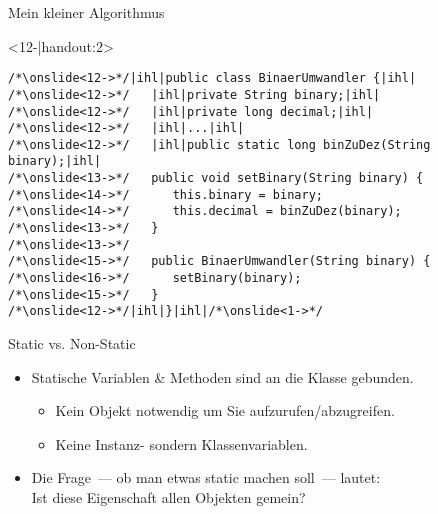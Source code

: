 \begin{frame}[fragile,c]{Mein kleiner Algorithmus}
\begin{onlyenv}<12-|handout:2>
\begin{verbatim}
/*\onslide<12->*/|ihl|public class BinaerUmwandler {|ihl|
/*\onslide<12->*/   |ihl|private String binary;|ihl|
/*\onslide<12->*/   |ihl|private long decimal;|ihl|
/*\onslide<12->*/   |ihl|...|ihl|
/*\onslide<12->*/   |ihl|public static long binZuDez(String binary);|ihl|
/*\onslide<13->*/   public void setBinary(String binary) {
/*\onslide<14->*/      this.binary = binary;
/*\onslide<14->*/      this.decimal = binZuDez(binary);
/*\onslide<13->*/   }
/*\onslide<13->*/
/*\onslide<15->*/   public BinaerUmwandler(String binary) {
/*\onslide<16->*/      setBinary(binary);
/*\onslide<15->*/   }
/*\onslide<12->*/|ihl|}|ihl|/*\onslide<1->*/
\end{verbatim}
\end{onlyenv}
\end{frame}
\SidebarReset


\begin{frame}[c]{Static vs. Non-Static}
   \begin{itemize}[<+(1)->]
      \itemsep11pt
      \item Statische Variablen \& Methoden sind an die Klasse gebunden. \begin{itemize}
         \item Kein Objekt notwendig um Sie aufzurufen/abzugreifen.
         \item Keine Instanz- sondern Klassenvariablen.
      \end{itemize}
      \item Die Frage~--- ob man etwas static machen soll~--- lautet:\\Ist diese Eigenschaft allen Objekten gemein?
   \end{itemize}
\end{frame}


